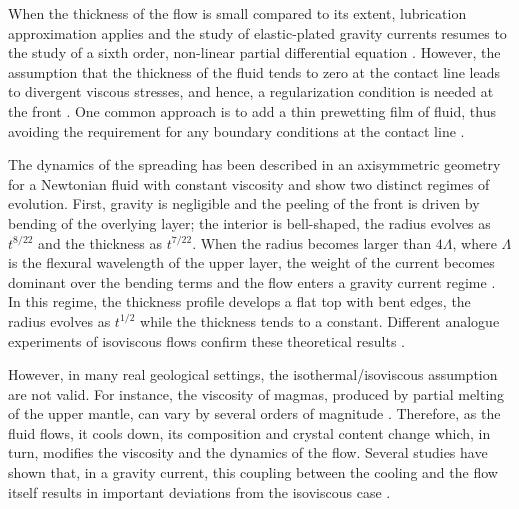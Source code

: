 When  the thickness  of  the flow  is small  compared  to its  extent,
lubrication  approximation applies  and  the  study of  elastic-plated
gravity currents  resumes to  the study of  a sixth  order, non-linear
partial                      differential                     equation
\citep{Michaut:2011kg,Lister:2013ia,Anonymous:QWXp_4JV}   .   However,
the assumption  that the thickness of  the fluid tends to  zero at the
contact  line  leads  to  divergent viscous  stresses,  and  hence,  a
regularization     condition     is     needed    at     the     front
\citep{Flitton:1999iv,Lister:2013ia,Anonymous:QWXp_4JV}.   One  common
approach is to add a thin  prewetting film of fluid, thus avoiding the
requirement  for   any  boundary   conditions  at  the   contact  line
\citep{Lister:2013ia,Anonymous:QWXp_4JV}.

The dynamics  of the spreading  has been described in  an axisymmetric
geometry   for    a   Newtonian   fluid   with    constant   viscosity
\citep{Michaut:2011kg,Lister:2013ia,Thorey:2014cv}   and    show   two
distinct regimes of  evolution.  First, gravity is  negligible and the
peeling of the front is driven  by bending of the overlying layer; the
interior  is bell-shaped,  the radius  evolves as  $t^{8/22}$ and  the
thickness  as  $t^{7/22}$.   When   the  radius  becomes  larger  than
$4\Lambda$, where  $\Lambda$ is the  flexural wavelength of  the upper
layer, the  weight of  the current becomes  dominant over  the bending
terms    and   the    flow   enters    a   gravity    current   regime
\citep{Huppert:1982a}.  In this regime, the thickness profile develops
a flat top with bent edges,  the radius evolves as $t^{1/2}$ while the
thickness  tends to  a  constant.  Different  analogue experiments  of
isoviscous     flows     confirm     these     theoretical     results
\citep{Dixon:1987js,Lister:2013ia}.

However, in  many real geological settings,  the isothermal/isoviscous
assumption  are not  valid.  For  instance, the  viscosity of  magmas,
produced by partial  melting of the upper mantle, can  vary by several
orders    of   magnitude    \citep{Anonymous:CZVBrBvv,Lejeune:1995fc}.
Therefore,  as the  fluid flows,  it cools  down, its  composition and
crystal content change which, in  turn, modifies the viscosity and the
dynamics of the  flow.  Several studies have shown that,  in a gravity
current, this coupling between the cooling and the flow itself results
in     important    deviations     from     the    isoviscous     case
\citep{Bercovici:2007vc,Bercovici:1996uu,BALMFORTH:1999ey,Garel:2014era}.


